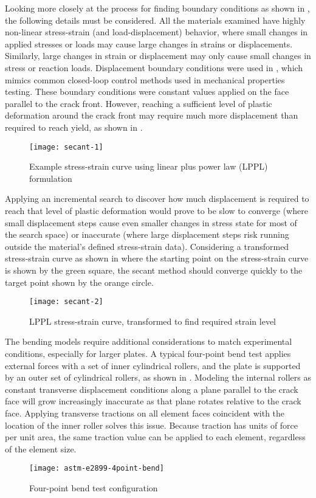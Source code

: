 Looking more closely at the process for finding boundary conditions as shown in , the following details must be considered.
All the materials examined have highly non-linear stress-strain (and load-displacement) behavior, where small changes in applied stresses or loads may cause large changes in strains or displacements.
Similarly, large changes in strain or displacement may only cause small changes in stress or reaction loads.
Displacement boundary conditions were used in \cite{allenwells2014}, which mimics common closed-loop control methods used in mechanical properties testing.
These boundary conditions were constant values applied on the face parallel to the crack front.
However, reaching a sufficient level of plastic deformation around the crack front may require much more displacement than required to reach yield, as shown in .
\begin{figure}[tbp]
\centering
\texttt{[image: secant-1]}
\caption{\label{fig:secant-1}Example stress-strain curve using linear plus power law (LPPL) formulation}
\end{figure}
Applying an incremental search to discover how much displacement is required to reach that level of plastic deformation would prove to be slow to converge (where small displacement steps cause even smaller changes in stress state for most of the search space) or inaccurate (where large displacement steps risk running outside the material's defined stress-strain data).
Considering a transformed stress-strain curve as shown in  where the starting point on the stress-strain curve is shown by the green square, the secant method should converge quickly to the target point shown by the orange circle.
\begin{figure}[tbp]
\centering
\texttt{[image: secant-2]}
\caption{\label{fig:secant-2}LPPL stress-strain curve, transformed to find required strain level}
\end{figure}

The bending models require additional considerations to match experimental conditions, especially for larger plates.
A typical four-point bend test applies external forces with a set of inner cylindrical rollers, and the plate is supported by an outer set of cylindrical rollers, as shown in .
Modeling the internal rollers as constant transverse displacement conditions along a plane parallel to the crack face will grow increasingly inaccurate as that plane rotates relative to the crack face.
Applying transverse tractions on all element faces coincident with the location of the inner roller solves this issue.
Because traction has units of force per unit area, the same traction value can be applied to each element, regardless of the element size.
\begin{figure}[tbp]
\centering
\texttt{[image: astm-e2899-4point-bend]}
\caption[Four-point bend test configuration]{\label{fig:astm-e2899-4point-bend} Four-point bend test configuration \cite{astme2899}}
\end{figure}

